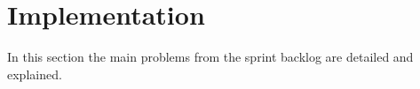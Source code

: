 \section{Implementation}
In this section the main problems from the sprint backlog are detailed and explained.






